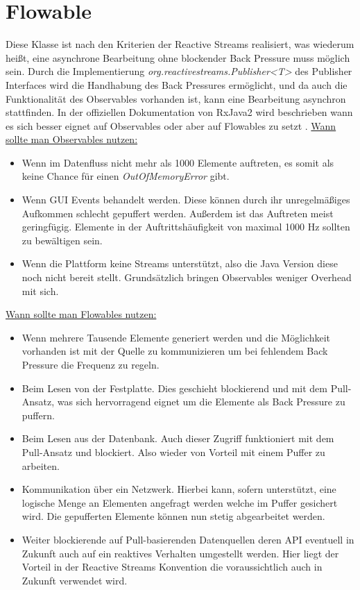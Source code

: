\section{Flowable}
Diese Klasse ist nach den Kriterien der Reactive Streams realisiert, was wiederum heißt, eine asynchrone Bearbeitung ohne blockender Back Pressure muss möglich sein. Durch die Implementierung \textit{org.reactivestreams.Publisher<T>} des Publisher Interfaces wird die Handhabung des Back Pressures ermöglicht, und da auch die Funktionalität des Observables vorhanden ist, kann eine Bearbeitung asynchron stattfinden. In der offiziellen Dokumentation von RxJava2 wird beschrieben wann es sich besser eignet auf Observables oder aber auf Flowables zu setzt \cite{rxdifference}. \underline{Wann sollte man Observables nutzen:}
\begin{itemize}
	\item Wenn im Datenfluss nicht mehr als 1000 Elemente auftreten, es somit als keine Chance für einen \textit{OutOfMemoryError} gibt.
	\item Wenn GUI Events behandelt werden. Diese können durch ihr unregelmäßiges Aufkommen schlecht gepuffert werden. Außerdem ist das Auftreten meist geringfügig. Elemente in der Auftrittshäufigkeit von maximal 1000 Hz sollten zu bewältigen sein.
	\item Wenn die Plattform keine Streams unterstützt, also die Java Version diese noch nicht bereit stellt. Grundsätzlich bringen Observables weniger Overhead mit sich.
\end{itemize}
\underline{Wann sollte man Flowables nutzen:}
\begin{itemize}
	\item Wenn mehrere Tausende Elemente generiert werden und die Möglichkeit vorhanden ist mit der Quelle zu kommunizieren um bei fehlendem Back Pressure die Frequenz zu regeln.
	\item Beim Lesen von der Festplatte. Dies geschieht blockierend und mit dem Pull-Ansatz, was sich hervorragend eignet um die Elemente als Back Pressure zu puffern.
	\item Beim Lesen aus der Datenbank. Auch dieser Zugriff funktioniert mit dem Pull-Ansatz und blockiert. Also wieder von Vorteil mit einem Puffer zu arbeiten.
	\item Kommunikation über ein Netzwerk. Hierbei kann, sofern unterstützt, eine logische Menge an Elementen angefragt werden welche im Puffer gesichert wird. Die gepufferten Elemente können nun stetig abgearbeitet werden.
	\item Weiter blockierende auf Pull-basierenden Datenquellen deren API eventuell in Zukunft auch auf ein reaktives Verhalten umgestellt werden. Hier liegt der Vorteil in der Reactive Streams Konvention die voraussichtlich auch in Zukunft verwendet wird.
\end{itemize}
